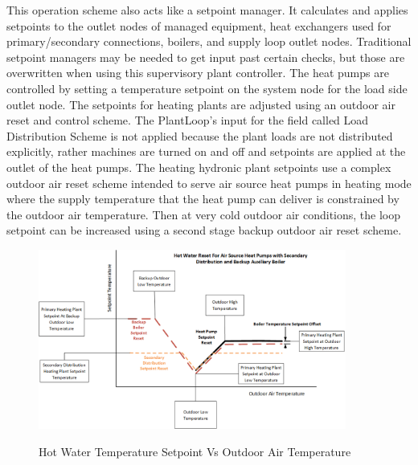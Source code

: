 This operation scheme also acts like a setpoint manager.  It calculates and applies setpoints to the outlet nodes of managed equipment, heat exchangers used for primary/secondary connections, boilers, and supply loop outlet nodes.  Traditional setpoint managers may be needed to get input past certain checks, but those are overwritten when using this supervisory plant controller.  The heat pumps are controlled by setting a temperature setpoint on the system node for the load side outlet node.  The setpoints for heating plants are adjusted using an outdoor air reset and control scheme.  The PlantLoop's input for the field called Load Distribution Scheme is not applied because the plant loads are not distributed explicitly, rather machines are turned on and off and setpoints are applied at the outlet of the heat pumps. The heating hydronic plant setpoints use a complex outdoor air reset scheme intended to serve air source heat pumps in heating mode where the supply temperature that the heat pump can deliver is constrained by the outdoor air temperature.  Then at very cold outdoor air conditions, the loop setpoint can be increased using a second stage backup outdoor air reset scheme. 

\begin{figure}[hbtp]
\centering
\includegraphics[width=0.9\textwidth, height=0.9\textheight, keepaspectratio=true]{media/HW_reset.png}
\caption{Hot Water Temperature Setpoint Vs Outdoor Air Temperature} \protect \label{fig:IO-ref-HW-reset-aux-backup-setpoint-reset}
\end{figure}

